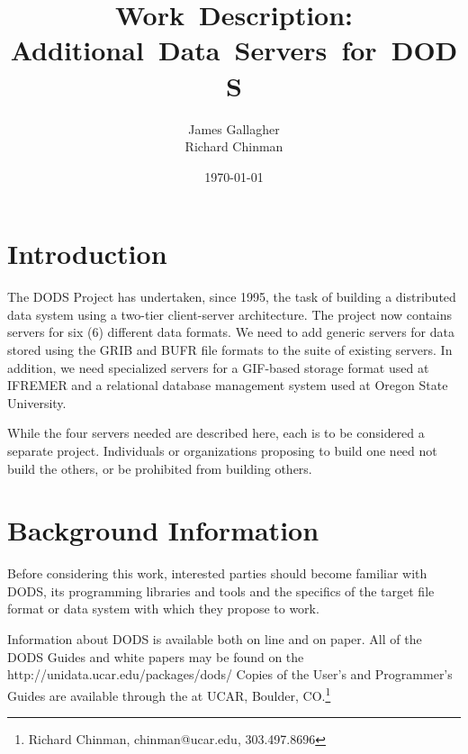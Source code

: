 \documentclass[12pt]{article}
\begin{document}
\title{Work~Description: Additional~Data~Servers~for~DODS}
\author{James Gallagher\\
Richard Chinman}
\date{\today}

\maketitle

\begin{htmlonly}
\end{htmlonly}

\tableofcontents

\section{Introduction}

The DODS Project has undertaken, since 1995, the task of building a
distributed data system using a two-tier client-server architecture.  The
project now contains servers for six (6) different data formats.  We need to
add generic servers for data stored using the GRIB and BUFR file formats to
the suite of existing servers. In addition, we need specialized servers for a
GIF-based storage format used at IFREMER and a relational database management
system used at Oregon State University.

While the four servers needed are described here, each is to be considered a
separate project. Individuals or organizations proposing to build one need
not build the others, or be prohibited from building others.

\section{Background Information}

Before considering this work, interested parties should become familiar
with DODS, its programming libraries and tools and the specifics of the
target file format or data system with which they propose to work. 

Information about DODS is available both on line and on paper. All of the
DODS Guides and white papers may be found on the  {http://unidata.ucar.edu/packages/dods/} Copies of the User's
and Programmer's Guides are available through the  at UCAR, Boulder,
CO.\footnote{Richard Chinman, chinman@ucar.edu, 303.497.8696}
\end{document}
